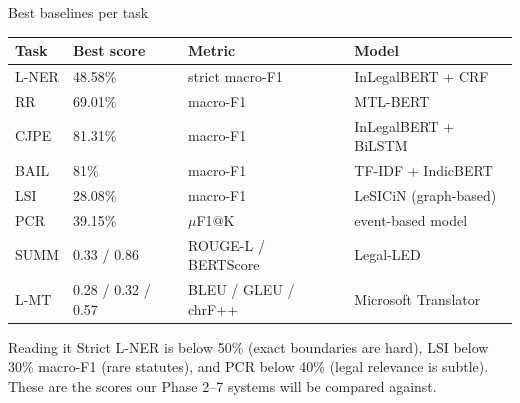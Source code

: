 \documentclass[aspectratio=169,11pt]{beamer}
\begin{document}
\begin{frame}{Best baselines per task}
  \centering
  \footnotesize
  \begin{tabular}{@{}llll@{}}
    \toprule
    Task & Best score & Metric & Model\\
    \midrule
    L-NER & 48.58\% & strict macro-F1 & InLegalBERT + CRF\\
    RR & 69.01\% & macro-F1 & MTL-BERT\\
    CJPE & 81.31\% & macro-F1 & InLegalBERT + BiLSTM\\
    BAIL & 81\% & macro-F1 & TF-IDF + IndicBERT\\
    LSI & 28.08\% & macro-F1 & LeSICiN (graph-based)\\
    PCR & 39.15\% & $\mu$F1@K & event-based model\\
    SUMM & 0.33 / 0.86 & ROUGE-L / BERTScore & Legal-LED\\
    L-MT & 0.28 / 0.32 / 0.57 & BLEU / GLEU / chrF++ & Microsoft Translator\\
    \bottomrule
  \end{tabular}
  \vspace{2mm}

  \raggedright
  \begin{exampleblock}{Reading it}
    \small
    Strict L-NER is below 50\% (exact boundaries are hard), LSI below 30\% macro-F1 (rare statutes), and PCR below 40\% (legal relevance is subtle).
    These are the scores our Phase 2--7 systems will be compared against.
  \end{exampleblock}
\end{frame}
\end{document}
